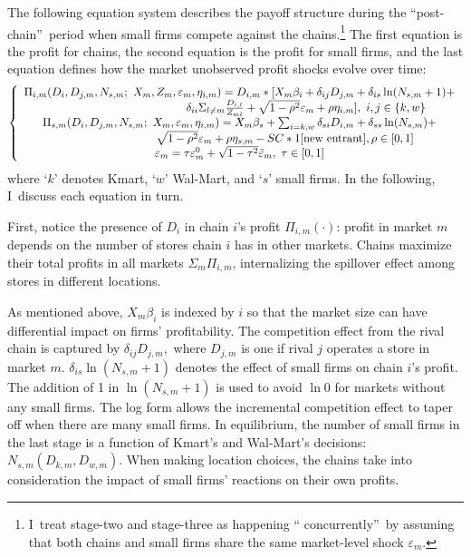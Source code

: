 \documentclass[notitlepage,onecolumn,11pt]{article}
\begin{document}
The following equation system describes the payoff structure during the
\textquotedblleft post-chain\textquotedblright\ period when small firms
compete against the chains.\footnote{%
I\ treat stage-two and stage-three as happening \textquotedblleft
concurrently\textquotedblright\ by assuming that both chains and small firms
share the same market-level shock $\varepsilon _{m}.$} The first equation is
the profit for chains, the second equation is the profit for small firms,
and the last equation defines how the market unobserved profit shocks evolve
over time:%
\begin{equation}
\left\{ 
\begin{array}{c}
\Pi _{i,m}(D_{i},D_{j,m},N_{s,m};~X_{m},Z_{m},\varepsilon _{m},\eta
_{i,m})=D_{i,m}\ast \lbrack X_{m}\beta _{i}+\delta _{ij}D_{j,m}+\delta
_{is}\ln (N_{s,m}+1)+ \\ 
\ \ \ \ \ \ \ \ \ \ \ \ \ \ \ \ \ \ \ \ \ \ \ \ \ \ \ \ \ \ \ \ \ \ \ \delta
_{ii}\Sigma _{l\neq m}\frac{D_{i,l}}{Z_{ml}}+\sqrt{1-\rho ^{2}}\varepsilon
_{m}+\rho \eta _{i,m}],~i,j\in \{k,w\} \\ 
\Pi _{s,m}(D_{i},D_{j,m},N_{s,m};~X_{m},\varepsilon _{m},\eta
_{i,m})=X_{m}\beta _{s}+\sum_{i=k,w}\delta _{si}D_{i,m}+\delta _{ss}\ln
(N_{s,m})+ \\ 
\ \ \ \ \ \ \ \ \ \ \ \ \ \ \ \ \ \ \ \ \ \ \ \ \sqrt{1-\rho ^{2}}%
\varepsilon _{m}+\rho \eta _{s,m}-SC\ast 1[\text{new entrant}],\rho \in
\lbrack 0,1] \\ 
\varepsilon _{m}=\tau \varepsilon _{m}^{0}+\sqrt{1-\tau ^{2}}\tilde{%
\varepsilon}_{m},\ \tau \in \lbrack 0,1]%
\end{array}%
\right.  \label{Profit}
\end{equation}%
where `$k$' denotes Kmart, `$w$' Wal-Mart, and `$s$' small firms. In the
following, I\ discuss each equation in turn.

First, notice the presence of $D_{i}$ in chain $i$'s profit $\Pi
_{i,m}(\cdot )$: profit in market $m$ depends on the number of stores chain $%
i$ has in other markets. Chains maximize their total profits in all markets $%
\Sigma _{m}\Pi _{i,m}$, internalizing the spillover effect among stores in
different locations.

As mentioned above, $X_{m}\beta _{i}$ is indexed by $i$ so that the market
size can have differential impact on firms' profitability. The competition
effect from the rival chain is captured by $\delta _{ij}D_{j,m},$ where $%
D_{j,m}$ is one if rival $j$ operates a store in market $m$. $\delta
_{is}\ln (N_{s,m}+1)$ denotes the effect of small firms on chain $i$'s
profit. The addition of 1 in $\ln (N_{s,m}+1)$ is used to avoid $\ln 0$ for
markets without any small firms. The log form allows the incremental
competition effect to taper off when there are many small firms. In
equilibrium, the number of small firms in the last stage is a function of
Kmart's and Wal-Mart's decisions: $N_{s,m}(D_{k,m},D_{w,m})$. When making
location choices, the chains take into consideration the impact of small
firms' reactions on their own profits.
\end{document}
